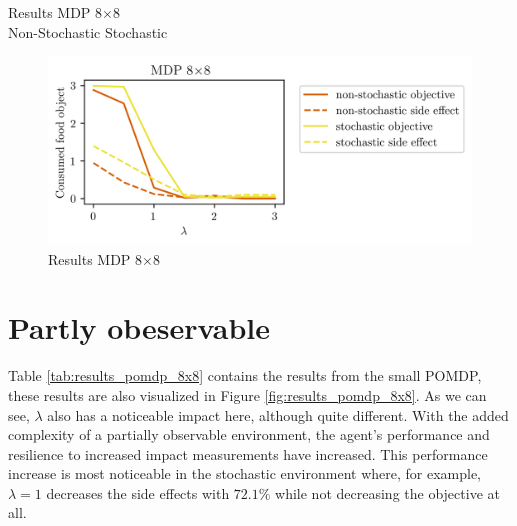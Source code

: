 \documentclass[12pt,A4]{report}
\theoremstyle{definition}
\begin{document}
\begin{table}[H]
  \centering
  \caption{Results MDP 8$\times$8\\
  Non-Stochastic \hspace{130pt} Stochastic}
  \vspace{-10pt}
  
  
  \label{tab:results_static_8x8}
\end{table}

\begin{figure}[H]
  \centering
  \includegraphics{"./figures/static_8x8_result_plot.png"}
  \caption{Results MDP 8$\times$8 }
  \label{fig:results_static_8x8}
\end{figure}


\section{Partly obeservable}
Table \ref{tab:results_pomdp_8x8} contains the results from the small POMDP, these results are also visualized in Figure \ref{fig:results_pomdp_8x8}. As we can see, $\lambda$ also has a noticeable impact here, although quite different. With the added complexity of a partially observable environment, the agent's performance and resilience to increased impact measurements have increased. This performance increase is most noticeable in the stochastic environment where, for example, $\lambda=1$ decreases the side effects with $72.1\%$ while not decreasing the objective at all. 
\end{document}
